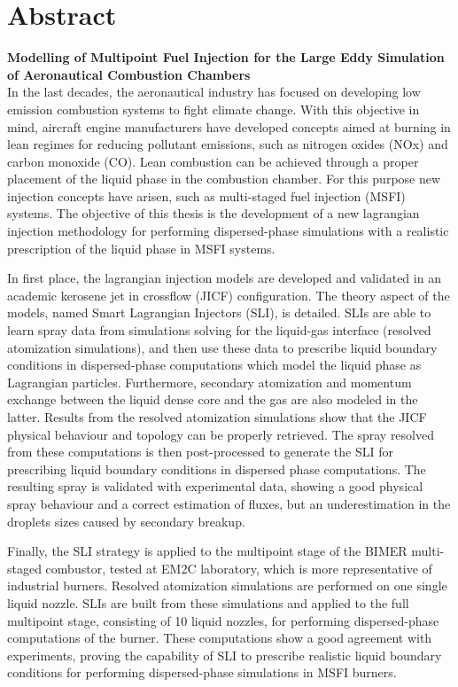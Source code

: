 \chapter*{Abstract}

{\large \textbf{Modelling of Multipoint Fuel Injection for the Large Eddy Simulation of Aeronautical Combustion Chambers }} \\
    
In the last decades, the aeronautical industry has focused on developing low emission combustion systems to fight climate change. With this objective in mind, aircraft engine manufacturers have developed concepts aimed at burning in lean regimes for reducing pollutant emissions, such as nitrogen oxides (NOx) and carbon monoxide (CO). Lean combustion can be achieved through a proper placement of the liquid phase in the combustion chamber. For this purpose new injection concepts have arisen, such as multi-staged fuel injection (MSFI) systems. The objective of this thesis is the development of a new lagrangian injection methodology for performing dispersed-phase simulations with a realistic prescription of the liquid phase in MSFI systems.

In first place, the lagrangian injection models are developed and validated in an academic kerosene jet in crossflow (JICF) configuration. The theory aspect of the models, named Smart Lagrangian Injectors (SLI), is detailed. SLIs are able to learn spray data from simulations solving for the liquid-gas interface (resolved atomization simulations), and then use these data to prescribe liquid boundary conditions in dispersed-phase computations which model the liquid phase as Lagrangian particles. Furthermore, secondary atomization and momentum exchange between the liquid dense core and the gas are also modeled in the latter.  Results from the resolved atomization simulations show that the JICF physical behaviour and topology can be properly retrieved. The spray resolved from these computations is then post-processed to generate the SLI for prescribing liquid boundary conditions in dispersed phase computations. The resulting spray is validated with experimental data, showing a good physical spray behaviour and a correct estimation of fluxes, but an underestimation in the droplets sizes caused by secondary breakup. 

Finally, the SLI strategy is applied to the multipoint stage of the BIMER multi-staged combustor, tested at EM2C laboratory, which is more representative of industrial burners. Resolved atomization simulations are performed on one single liquid nozzle. SLIs are built from these simulations and applied to the full multipoint stage, consisting of 10 liquid nozzles, for performing dispersed-phase computations of the burner. These computations show a good agreement with experiments, proving the capability of SLI to prescribe realistic liquid boundary conditions for performing dispersed-phase simulations in MSFI burners.

